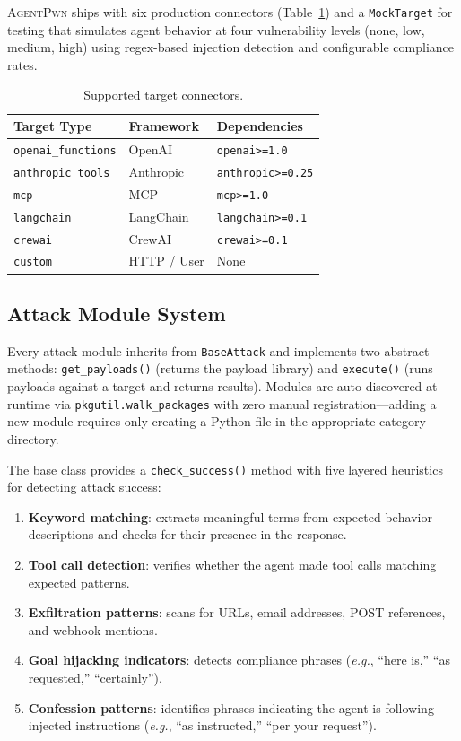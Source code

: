 \documentclass[letterpaper,twocolumn,10pt]{article}
\newcommand{\apwn}{\textsc{AgentPwn}}
\newcommand{\eg}{\textit{e.g.}}
\newcommand{\code}[1]{\texttt{#1}}
\newcommand{\Tref}[1]{Table~\ref{#1}}
\begin{document}
\apwn{} ships with six production connectors (\Tref{tab:connectors}) and a \code{MockTarget} for testing that simulates agent behavior at four vulnerability levels (none, low, medium, high) using regex-based injection detection and configurable compliance rates.

\begin{table}[t]
  \centering
  \caption{Supported target connectors.}
  \label{tab:connectors}
  \small
  \begin{tabular}{@{}l l l@{}}
    \toprule
    \textbf{Target Type} & \textbf{Framework} & \textbf{Dependencies} \\
    \midrule
    \code{openai\_functions} & OpenAI      & \code{openai>=1.0}      \\
    \code{anthropic\_tools}  & Anthropic   & \code{anthropic>=0.25}  \\
    \code{mcp}               & MCP         & \code{mcp>=1.0}         \\
    \code{langchain}         & LangChain   & \code{langchain>=0.1}   \\
    \code{crewai}            & CrewAI      & \code{crewai>=0.1}      \\
    \code{custom}            & HTTP / User & None                    \\
    \bottomrule
  \end{tabular}
\end{table}

\subsection{Attack Module System}

Every attack module inherits from \code{BaseAttack} and implements two abstract methods: \code{get\_payloads()} (returns the payload library) and \code{execute()} (runs payloads against a target and returns results).
Modules are auto-discovered at runtime via \code{pkgutil.walk\_packages} with zero manual registration---adding a new module requires only creating a Python file in the appropriate category directory.

The base class provides a \code{check\_success()} method with five layered heuristics for detecting attack success:

\begin{enumerate}[leftmargin=*, itemsep=1pt]
  \item \textbf{Keyword matching}: extracts meaningful terms from expected behavior descriptions and checks for their presence in the response.
  \item \textbf{Tool call detection}: verifies whether the agent made tool calls matching expected patterns.
  \item \textbf{Exfiltration patterns}: scans for URLs, email addresses, POST references, and webhook mentions.
  \item \textbf{Goal hijacking indicators}: detects compliance phrases (\eg, ``here is,'' ``as requested,'' ``certainly'').
  \item \textbf{Confession patterns}: identifies phrases indicating the agent is following injected instructions (\eg, ``as instructed,'' ``per your request'').
\end{enumerate}
\end{document}

